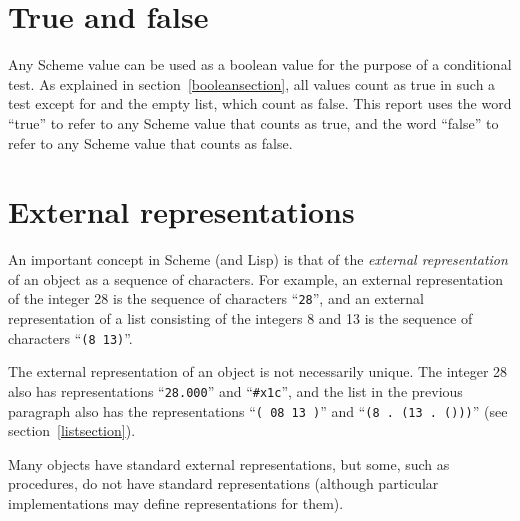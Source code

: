 



\section{True and false}

Any Scheme value can be used as a boolean value for the purpose of a
conditional test.  As explained in section~\ref{booleansection}, all
values count as true in such a test except for \schfalse{} and the empty
list, which count as false.  This report uses the word ``true'' to refer
to any Scheme value that counts as true, and the word ``false'' to refer
to any Scheme value that counts as false.
 



\section{External representations}
\label{externalreps}

An important concept in Scheme (and Lisp) is that of the {\em external
representation} of an object as a sequence of characters.  For example,
an external representation of the integer 28 is the sequence of
characters ``{\tt 28}'', and an external representation of a list consisting
of the integers 8 and 13 is the sequence of characters ``{\tt(8 13)}''.

The external representation of an object is not necessarily unique.  The
integer 28 also has representations ``{\tt 28.000}'' and ``{\tt\#x1c}'', and the
list in the previous paragraph also has the representations ``{\tt( 08 13
)}'' and ``{\tt(8 .\ (13 .\ ()))}'' (see section~\ref{listsection}).

Many objects have standard external representations, but some, such as
procedures, do not have standard representations (although particular
implementations may define representations for them).

